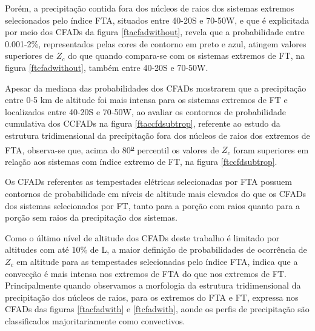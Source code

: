 Porém, a precipitação contida fora dos núcleos de raios dos sistemas extremos selecionados pelo índice FTA, situados entre 40-20S e 70-50W,  e que é explicitada por meio dos CFADs da figura \ref{ftacfadwithout}, revela que a probabilidade entre 0.001-2\%, representados pelas cores de contorno em preto e azul, atingem valores superiores de $Z_c$ do que quando compara-se com os sistemas extremos de FT, na figura \ref{ftcfadwithout}, também entre 40-20S e 70-50W.

Apesar da mediana das probabilidades dos CFADs mostrarem que a precipitação entre 0-5 km de altitude foi mais intensa para os sistemas extremos de FT e localizados entre 40-20S e 70-50W, ao avaliar os contornos de probabilidade cumulativa dos CCFADs na figura \ref{ftaccfdsubtrop}, referente ao estudo da estrutura tridimensional da precipitação fora dos núcleos de raios dos extremos de FTA, observa-se que, acima do 80\textsuperscript{\underline{o}} percentil os valores de $Z_c$ foram superiores em relação aos sistemas com índice extremo de FT, na figura \ref{ftccfdsubtrop}.

Os CFADs referentes as tempestades elétricas selecionadas por FTA possuem contornos de probabilidade em níveis de altitude mais elevados do que os CFADs dos sistemas selecionados por FT, tanto para a porção com raios quanto para a porção sem raios da precipitação dos sistemas.




Como o último nível de altitude dos CFADs deste trabalho é limitado por altitudes com até 10\% de L, a maior definição de probabilidades de ocorrência de $Z_c$ em altitude para as tempestades selecionadas pelo índice FTA, indica que a convecção é mais intensa nos extremos de FTA do que nos extremos de FT. Principalmente quando observamos a morfologia da estrutura tridimensional da precipitação dos núcleos de raios, para os extremos do FTA e FT, expressa nos CFADs das figuras \ref{ftacfadwith} e \ref{ftcfadwith}, aonde os perfis de precipitação são classificados majoritariamente como convectivos.

